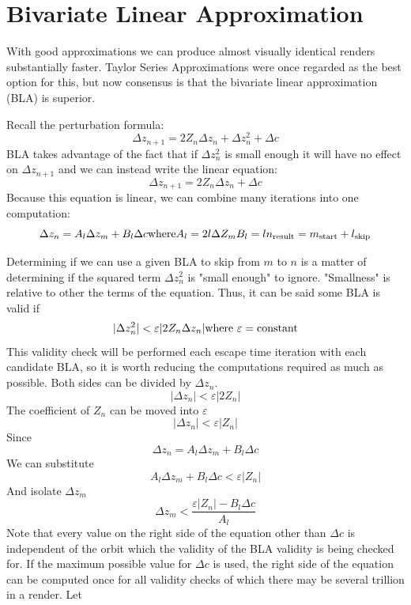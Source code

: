 \documentclass{article}
\begin{document}
\section{Bivariate Linear Approximation}
\par With good approximations we can produce almost visually identical renders substantially faster. Taylor Series Approximations were once regarded as the best option for this, but now consensus is that the bivariate linear approximation (BLA) is superior.
\par Recall the perturbation formula: 
\[
    \Delta z_{n+1} = 2Z_n\Delta z_n + \Delta z_n^2 + \Delta c
\]\cite{Thompson_2023}
BLA takes advantage of the fact that if $\Delta z_n^2$ is small enough it will have no effect on $\Delta z_{n+1}$ and we can instead write the linear equation:
\[
    \Delta z_{n+1} = 2Z_n\Delta z_n + \Delta c
\]
Because this equation is linear, we can combine many iterations into one computation:
\[
    \Delta z_n = A_l\Delta z_m + B_l\Delta c \\
    \text{where} \\
    A_l = 2l\Delta Z_m\\
    B_l = l \\
    n_\text{result} = m_\text{start} + l_\text{skip}
\]\cite{Thompson_2023}
\par Determining if we can use a given BLA to skip from $m$ to $n$ is a matter of determining if the squared term $\Delta z_n^2$ is "small enough" to ignore. "Smallness" is relative to other the terms of the equation. Thus, it can be said some BLA is valid if
\[
|\Delta z_n^2| < \varepsilon|2Z_n\Delta z_n| \\
\text{where } \varepsilon=\text{constant}
\]
This validity check will be performed each escape time iteration with each candidate BLA, so it is worth reducing the computations required as much as possible. 
Both sides can be divided by $\Delta z_n$.
\[
|\Delta z_n| < \varepsilon|2Z_n|
\]
The coefficient of $Z_n$ can be moved into $\varepsilon$
\[
|\Delta z_n| < \varepsilon|Z_n|
\]
Since
\[
\Delta z_n = A_l\Delta z_m + B_l\Delta c
\]
We can substitute
\[
A_l\Delta z_m + B_l\Delta c < \varepsilon|Z_n|
\]
And isolate $\Delta z_m$
\[
\Delta z_m < \frac{\varepsilon|Z_n| - B_l\Delta c}{A_l}
\]\cite{Thompson_2023}
Note that every value on the right side of the equation other than $\Delta c$ is independent of the orbit which the validity of the BLA validity is being checked for. If the maximum possible value for $\Delta c$ is used, the right side of the equation can be computed once for all validity checks of which there may be several trillion in a render. Let 
\end{document}
